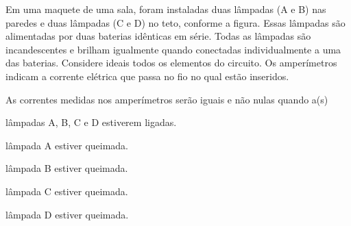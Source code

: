 Em uma maquete de uma sala, foram instaladas duas lâmpadas (A e B) nas paredes e duas lâmpadas (C e D) no teto, conforme a figura. Essas lâmpadas são alimentadas por duas baterias idênticas em série. Todas as lâmpadas são incandescentes e brilham igualmente quando conectadas individualmente a uma das baterias. Considere ideais todos os elementos do circuito. Os amperímetros indicam a corrente elétrica que passa no fio no qual estão inseridos.\par
{}
As correntes medidas nos amperímetros serão iguais e não nulas quando a(s)\par
\begin{alternativas}
  \item lâmpadas A, B, C e D estiverem ligadas.
  \item lâmpada A estiver queimada.
  \item lâmpada B estiver queimada.
  \item lâmpada C estiver queimada.
  \item lâmpada D estiver queimada.
\end{alternativas}

